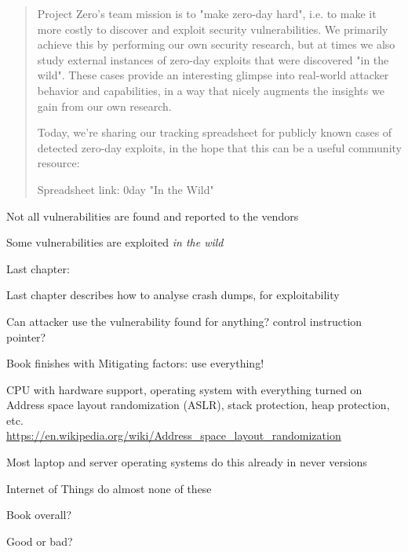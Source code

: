 \documentclass[Screen16to9,17pt]{foils}
\begin{document}

\begin{quote}

  Project Zero's team mission is to "make zero-day hard", i.e. to make it more costly to discover and exploit security vulnerabilities. We primarily achieve this by performing our own security research, but at times we also study external instances of zero-day exploits that were discovered "in the wild". These cases provide an interesting glimpse into real-world attacker behavior and capabilities, in a way that nicely augments the insights we gain from our own research.

  Today, we're sharing our tracking spreadsheet for publicly known cases of detected zero-day exploits, in the hope that this can be a useful community resource:

  Spreadsheet link: 0day "In the Wild"\\
\end{quote}

\begin{list2}
\item Not all vulnerabilities are found and reported to the vendors
\item Some vulnerabilities are exploited \emph{in the wild}
\end{list2}


Last chapter:
\begin{list2}
\item Last chapter describes how to analyse crash dumps, for exploitability
\item Can attacker use the vulnerability found for anything? control instruction pointer?
\item Book finishes with Mitigating factors: use everything!
\item CPU with hardware support, operating system with everything turned on Address space layout randomization (ASLR), stack protection, heap protection, etc.\\
\url{https://en.wikipedia.org/wiki/Address_space_layout_randomization}
\item Most laptop and server operating systems do this already in never versions\smiley
\item Internet of Things do almost none of these
\end{list2}

Book overall?

Good or bad?


\slidenext{}
\end{document}
